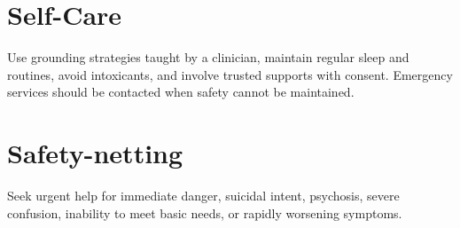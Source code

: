 \section*{Self-Care}
Use grounding strategies taught by a clinician, maintain regular sleep and routines, avoid intoxicants, and involve trusted supports with consent. Emergency services should be contacted when safety cannot be maintained.
\section*{Safety-netting}
Seek urgent help for immediate danger, suicidal intent, psychosis, severe confusion, inability to meet basic needs, or rapidly worsening symptoms.
